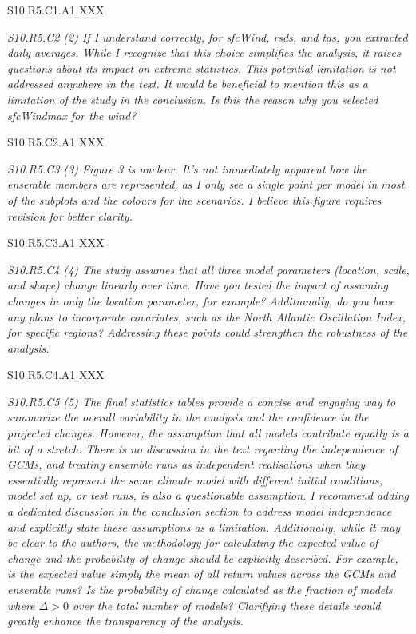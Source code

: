 \documentclass[a4paper,10pt]{article}
\begin{document}
	S10.R5.C1.A1 XXX

	\emph{S10.R5.C2 (2) If I understand correctly, for sfcWind, rsds, and tas, you extracted daily averages. While I recognize that this choice simplifies the analysis, it raises questions about its impact on extreme statistics. This potential limitation is not addressed anywhere in the text. It would be beneficial to mention this as a limitation of the study in the conclusion. Is this the reason why you selected sfcWindmax for the wind?}

	S10.R5.C2.A1 XXX

	\emph{S10.R5.C3 (3) Figure 3 is unclear. It's not immediately apparent how the ensemble members are represented, as I only see a single point per model in most of the subplots and the colours for the scenarios. I believe this figure requires revision for better clarity.}

	S10.R5.C3.A1 XXX

	\emph{S10.R5.C4 (4) The study assumes that all three model parameters (location, scale, and shape) change linearly over time. Have you tested the impact of assuming changes in only the location parameter, for example? Additionally, do you have any plans to incorporate covariates, such as the North Atlantic Oscillation Index, for specific regions? Addressing these points could strengthen the robustness of the analysis.}

	S10.R5.C4.A1 XXX

	\emph{S10.R5.C5 (5) The final statistics tables provide a concise and engaging way to summarize the overall variability in the analysis and the confidence in the projected changes. However, the assumption that all models contribute equally is a bit of a stretch. There is no discussion in the text regarding the independence of GCMs, and treating ensemble runs as independent realisations when they essentially represent the same climate model with different initial conditions, model set up, or test runs, is also a questionable assumption. I recommend adding a dedicated discussion in the conclusion section to address model independence and explicitly state these assumptions as a limitation. Additionally, while it may be clear to the authors, the methodology for calculating the expected value of change and the probability of change should be explicitly described. For example, is the expected value simply the mean of all return values across the GCMs and ensemble runs? Is the probability of change calculated as the fraction of models where $\Delta > 0$ over the total number of models? Clarifying these details would greatly enhance the transparency of the analysis.}
\end{document}
